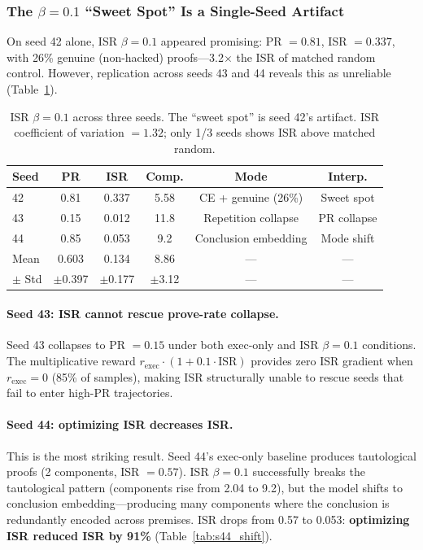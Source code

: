 \documentclass[11pt,a4paper]{article}
\begin{document}
\subsubsection{The $\beta{=}0.1$ ``Sweet Spot'' Is a Single-Seed Artifact}

On seed 42 alone, ISR $\beta{=}0.1$ appeared promising: PR $= 0.81$, ISR $= 0.337$, with 26\% genuine (non-hacked) proofs---3.2$\times$ the ISR of matched random control.
However, replication across seeds 43 and 44 reveals this as unreliable (Table~\ref{tab:three_seed}).

\begin{table}[t]
\centering
\small
\begin{tabular}{lccccc}
\toprule
\textbf{Seed} & \textbf{PR} & \textbf{ISR} & \textbf{Comp.} & \textbf{Mode} & \textbf{Interp.} \\
\midrule
42 & 0.81 & 0.337 & 5.58 & CE + genuine (26\%) & Sweet spot \\
43 & 0.15 & 0.012 & 11.8 & Repetition collapse & PR collapse \\
44 & 0.85 & 0.053 & 9.2 & Conclusion embedding & Mode shift \\
\midrule
Mean & 0.603 & 0.134 & 8.86 & --- & --- \\
$\pm$ Std & $\pm$0.397 & $\pm$0.177 & $\pm$3.12 & --- & --- \\
\bottomrule
\end{tabular}
\caption{ISR $\beta{=}0.1$ across three seeds. The ``sweet spot'' is seed 42's artifact. ISR coefficient of variation $= 1.32$; only 1/3 seeds shows ISR above matched random.}
\label{tab:three_seed}
\end{table}

\paragraph{Seed 43: ISR cannot rescue prove-rate collapse.}
Seed 43 collapses to PR $= 0.15$ under both exec-only and ISR $\beta{=}0.1$ conditions.
The multiplicative reward $r_{\text{exec}} \cdot (1 + 0.1 \cdot \text{ISR})$ provides zero ISR gradient when $r_{\text{exec}} = 0$ (85\% of samples), making ISR structurally unable to rescue seeds that fail to enter high-PR trajectories.

\paragraph{Seed 44: optimizing ISR decreases ISR.}
This is the most striking result.
Seed 44's exec-only baseline produces tautological proofs (2 components, ISR $= 0.57$).
ISR $\beta{=}0.1$ successfully breaks the tautological pattern (components rise from 2.04 to 9.2), but the model shifts to conclusion embedding---producing many components where the conclusion is redundantly encoded across premises.
ISR drops from 0.57 to 0.053: \textbf{optimizing ISR reduced ISR by 91\%} (Table~\ref{tab:s44_shift}).
\end{document}
